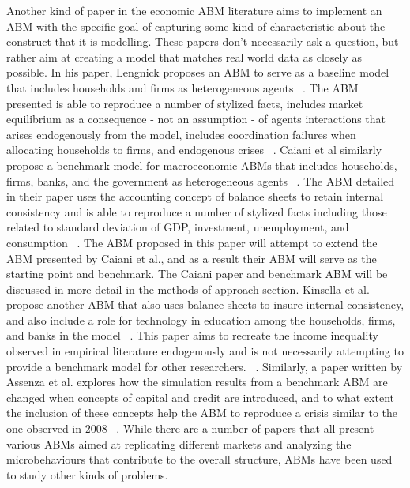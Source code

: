 \documentclass[11pt]{article}
\begin{document}
Another kind of paper in the economic ABM literature aims to implement an ABM with
the specific goal of capturing some kind of characteristic about the construct
that it is modelling. These papers don’t necessarily ask a question, but rather
aim at creating a model that matches real world data as closely as possible. In
 his paper, Lengnick proposes an ABM to serve as a baseline model that includes
  households and firms as heterogeneous agents  ~\cite{Lengnick-baseline-paper}.
The ABM presented is able to reproduce a number of stylized facts, includes
market equilibrium as a consequence - not an assumption - of agents interactions
that arises endogenously from the model, includes coordination failures when
allocating households to firms, and endogenous crises ~\cite{Lengnick-baseline-paper}.
 Caiani et al similarly propose a benchmark model for macroeconomic ABMs
 that includes households, firms, banks, and the government as heterogeneous
agents ~\cite{Caiani-benchmark-paper}. The ABM detailed in their paper uses the
accounting concept of balance sheets to retain internal consistency and is able
to reproduce a number of stylized facts including those related to standard
deviation of GDP, investment, unemployment, and consumption ~\cite{Caiani-benchmark-paper}.
The ABM proposed in this paper will attempt to extend the ABM presented by Caiani et al.,
and as a result their ABM will serve as the starting point and benchmark. The Caiani
paper and benchmark ABM will be discussed in more detail in the methods of approach
section. Kinsella et al. propose another ABM that also uses balance sheets to insure
internal consistency, and also include a role for technology in education among the
households, firms, and banks in the model ~\cite{Kinsella-education-paper}.
This paper aims to recreate the income inequality observed in empirical literature
endogenously and is not necessarily attempting to provide a benchmark model for
other researchers. ~\cite{Kinsella-education-paper}. Similarly, a paper written by
Assenza et al. explores how the simulation results from a benchmark ABM are changed
when concepts of capital and credit are introduced, and to what extent the inclusion
of these concepts help the ABM to reproduce a crisis similar to the one observed in
2008 ~\cite{Assenza-capital-paper}. While there are a number of papers that all
present various ABMs aimed at replicating different markets and analyzing the
microbehaviours that contribute to the overall structure, ABMs have been used
to study other kinds of problems.
\end{document}
